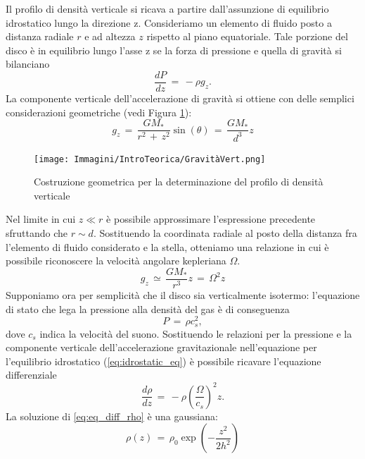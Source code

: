 Il profilo di densità verticale si ricava a partire dall'assunzione di equilibrio idrostatico lungo la direzione z. Consideriamo un elemento di fluido posto a distanza radiale $r$ e ad altezza $z$ rispetto al piano equatoriale. 
Tale porzione del disco è in equilibrio lungo l'asse z se la forza di pressione e quella di gravità si bilanciano
\begin{equation}
\frac{dP}{dz}\,=\,-\rho g_z.
\label{eq:idrostatic_eq}
\end{equation}
La componente verticale dell'accelerazione di gravità si ottiene con delle semplici considerazioni geometriche (vedi Figura \ref{fig:costr_geom}):
\begin{equation}
g_z\,=\,\frac{GM_\ast}{r^2\,+\,z^2}\sin{\left(\theta\right)}\,=\,\frac{GM_\ast}{d^3}z
\label{eq:vertical_g}
\end{equation}
\begin{figure}[H]
    \centering
    \texttt{[image: Immagini/IntroTeorica/GravitàVert.png]}
    \caption{Costruzione geometrica per la determinazione del profilo di densità verticale}
    \label{fig:costr_geom}
\end{figure}
Nel limite in cui $z\ll r$ è possibile approssimare l'espressione precedente sfruttando che $r\sim d$. Sostituendo la coordinata radiale al posto della distanza fra l'elemento di fluido considerato e la stella, otteniamo una relazione in cui è possibile riconoscere la velocità angolare kepleriana $\Omega$.
\begin{equation}
g_z\,\simeq\,\frac{GM_\ast}{r^3}z\,=\,\Omega^2 z
\label{eq:vertical_g_1}
\end{equation}
Supponiamo ora per semplicità che il disco sia verticalmente isotermo: l'equazione di stato che lega la pressione alla densità del gas è di conseguenza
\begin{equation}
P\,=\,\rho c_s^2,
\label{eq:isothermal}
\end{equation}
dove $c_s$ indica la velocità del suono. Sostituendo le relazioni per la pressione e la componente verticale dell'accelerazione gravitazionale nell'equazione per l'equilibrio idrostatico (\ref{eq:idrostatic_eq}) è possibile ricavare l'equazione differenziale
\begin{equation}
\frac{d\rho}{dz}\,=\,-\rho \left(\frac{\Omega}{c_s}\right)^2 z.
\label{eq:eq_diff_rho}
\end{equation}
La soluzione  di \eqref{eq:eq_diff_rho} è una gaussiana:
\begin{equation}
\rho (z)\,=\,\rho_0 \exp\left(-\frac{z^2}{2h^2}\right)
\label{eq:dens_prof}
\end{equation}
